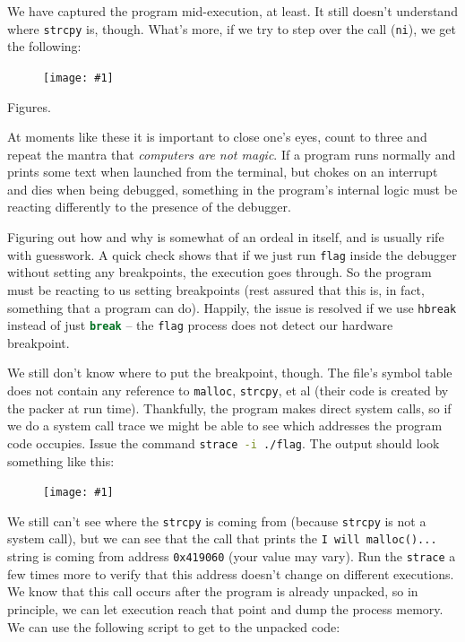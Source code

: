 \documentclass{article}
\newcommand{\displayimage}[1] {
\begin{figure}[H]
    \centering
    \texttt{[image: \#1]} 
\end{figure}
}
\newcommand{\xcode}[2]{\colorbox{ubuntuback}{\lstinline[language=#1]|#2|}}
\newcommand{\code}[1]{\colorbox{ubuntuback}{\texttt{#1}}}
\newcommand{\gdb}[1]{\xcode{C}{#1}}
\begin{document}
We have captured the program mid-execution, at least. It still doesn't understand where \xcode{C}{strcpy} is, though. What's more, if we try to step over the call (\gdb{ni}), we get the following:

\displayimage{../03_flag/interrupt.png}

Figures.

At moments like these it is important to close one's eyes, count to three and repeat the mantra that \textit{computers are not magic}. If a program runs normally and prints some text when launched from the terminal, but chokes on an interrupt and dies when being debugged, something in the program's internal logic must be reacting differently to the presence of the debugger. 

Figuring out how and why is somewhat of an ordeal in itself, and is usually rife with guesswork. A quick check shows that if we just run \xcode{bash}{flag} inside the debugger without setting any breakpoints, the execution goes through. So the program must be reacting to us setting breakpoints (rest assured that this is, in fact, something that a program can do). Happily, the issue is resolved if we use \gdb{hbreak} instead of just \gdb{break} -- the \xcode{bash}{flag} process does not detect our hardware breakpoint.

We still don't know where to put the breakpoint, though. The file's symbol table does not contain any reference to \xcode{C}{malloc}, \xcode{C}{strcpy}, et al (their code is created by the packer at run time). Thankfully, the program makes direct system calls, so if we do a system call trace we might be able to see which addresses the program code occupies. Issue the command \xcode{bash}{strace -i ./flag}. The output should look something like this:

\displayimage{../03_flag/strace.png}

We still can't see where the \xcode{C}{strcpy} is coming from (because \xcode{C}{strcpy} is not a system call), but we can see that the call that prints the \code{I will malloc()...} string is coming from address \code{0x419060} (your value may vary). Run the \xcode{bash}{strace} a few times more to verify that this address doesn't change on different executions. We know that this call occurs after the program is already unpacked, so in principle, we can let execution reach that point and dump the process memory. We can use the following script to get to the unpacked code:


\end{document}
